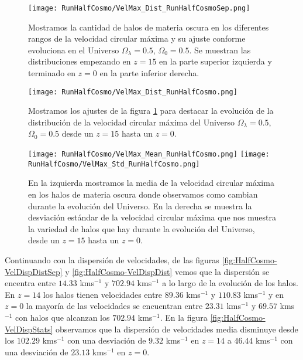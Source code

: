 \begin{figure}[H]
    \centering
    \texttt{[image: RunHalfCosmo/VelMax\_Dist\_RunHalfCosmoSep.png]}
    \caption[Velocidad circular máxima]{\footnotesize Mostramos la cantidad de halos de materia oscura en los diferentes rangos de la velocidad circular máxima y su ajuste conforme evoluciona en el Universo $\Omega_\lambda = 0.5$, $\Omega_0 = 0.5$. Se muestran las distribuciones empezando en $z=15$ en la parte superior izquierda y terminado en $z=0$ en la parte inferior derecha.}
    \label{fig:HalfCosmo-VelMaxDistSep}
\end{figure}

\begin{figure}[H]
    \centering
    \texttt{[image: RunHalfCosmo/VelMax\_Dist\_RunHalfCosmo.png]}
    \caption[Distribución de la velocidad circular máxima]{\footnotesize Mostramos los ajustes de la figura \ref{fig:HalfCosmo-VelMaxDistSep} para destacar la evolución de la distribución de la velocidad circular máxima del Universo $\Omega_\lambda = 0.5$, $\Omega_0 = 0.5$ desde un $z=15$ hasta un $z=0$.}
    \label{fig:HalfCosmo-VelMaxDist}
\end{figure}

\begin{figure}[H]
    \centering
    \texttt{[image: RunHalfCosmo/VelMax\_Mean\_RunHalfCosmo.png]}
    \texttt{[image: RunHalfCosmo/VelMax\_Std\_RunHalfCosmo.png]}
    \caption[Media y desviación estándar de la velocidad circular máxima]{\footnotesize En la izquierda mostramos la media de la velocidad circular máxima en los halos de materia oscura donde observamos como cambian durante la evolución del Universo. En la derecha se muestra la desviación estándar de la velocidad circular máxima que nos muestra la variedad de halos que hay durante la evolución del Universo, desde un $z=15$ hasta un $z=0$.}
    \label{fig:HalfCosmo-VelMaxStats}
\end{figure}

Continuando con la dispersión de velocidades, de las figuras \ref{fig:HalfCosmo-VelDispDistSep} y \ref{fig:HalfCosmo-VelDispDist} vemos que la dispersión se encentra entre $14.33$ kms$^{-1}$ y $702.94$ kms$^{-1}$ a lo largo de la evolución de los halos. En $z=14$ los halos tienen velocidades entre $89.36$ kms$^{-1}$ y $110.83$ kms$^{-1}$ y en $z=0$ la mayoría de las velocidades se encuentran entre $23.31$ kms$^{-1}$ y $69.57$ kms$^{-1}$ con halos que alcanzan los $702.94$ kms$^{-1}$. En la figura \ref{fig:HalfCosmo-VelDispStats} observamos que la dispersión de velocidades media disminuye desde los $102.29$ kms$^{-1}$ con una desviación de $9.32$ kms$^{-1}$ en $z=14$ a $46.44$ kms$^{-1}$ con una desviación de $23.13$ kms$^{-1}$ en $z=0$.

